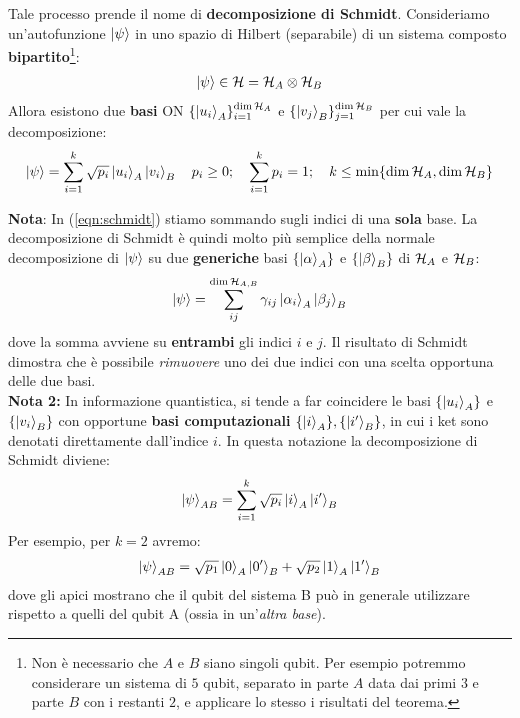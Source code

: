 \documentclass[../../InformazioneQuantistica.tex]{subfiles}
\begin{document}
Tale processo prende il nome di \textbf{decomposizione di Schmidt}. Consideriamo un'autofunzione $\Ket{\psi}$ in uno spazio di Hilbert (separabile) di un sistema composto \textbf{bipartito}\footnote{Non è necessario che $A$ e $B$ siano singoli qubit. Per esempio potremmo considerare un sistema di $5$ qubit, separato in parte $A$ data dai primi $3$ e parte $B$ con i restanti $2$, e applicare lo stesso i risultati del teorema.}:
\begin{align*}
\Ket{\psi}\in \mathcal{H} = \mathcal{H}_A \otimes \mathcal{H}_B
\end{align*}
Allora esistono due \textbf{basi} ON $\{\Ket{u_i}_A\}_{i=1}^{\operatorname{dim}\mathcal{H}_A}$ e $\{\Ket{v_j}_B\}_{j=1}^{\operatorname{dim}\mathcal{H}_B}$ per cui vale la decomposizione:
\begin{align}
\Ket{\psi}=\sum_{i=1}^k \sqrt{p_i} \Ket{u_i}_A \Ket{v_i}_B \quad p_i \geq 0;\quad \sum_{i=1}^k p_i = 1; \quad k\leq\min\{\operatorname{dim}\mathcal{H}_A
, \operatorname{dim}\mathcal{H}_B\}\label{eqn:schmidt}
\end{align}

\textbf{Nota}: In (\ref{eqn:schmidt}) stiamo sommando sugli indici di una \textbf{sola} base. La decomposizione di Schmidt è quindi molto più semplice della normale decomposizione di $\Ket{\psi}$ su due \textbf{generiche} basi $\{\Ket{\alpha}_A\}$ e $\{\Ket{\beta}_B\}$ di $\mathcal{H}_A$ e $\mathcal{H}_B$:
\begin{align}
\Ket{\psi} = \sum_{ij}^{\operatorname{dim}\mathcal{H}_{A,B}} \gamma_{ij}\Ket{\alpha_i}_A\Ket{\beta_j}_B\label{eqn:decomp-composto}
\end{align}
dove la somma avviene su \textbf{entrambi} gli indici $i$ e $j$. Il risultato di Schmidt dimostra che è possibile \textit{rimuovere} uno dei due indici con una scelta opportuna delle due basi.\\

\textbf{Nota 2:} In informazione quantistica, si tende a far coincidere le basi $\{\Ket{u_i}_A\}$ e $\{\Ket{v_i}_B\}$ con opportune \textbf{basi computazionali} $\{\Ket{i}_A\}, \{\Ket{i'}_B\}$, in cui i ket sono denotati  direttamente dall'indice $i$. In questa notazione la decomposizione di Schmidt diviene:
\begin{align*}
\Ket{\psi}_{AB} =\sum_{i=1}^k \sqrt{p_i} \Ket{i}_A \Ket{i'}_B
\end{align*}
Per esempio, per $k=2$ avremo:
\begin{align*}
\Ket{\psi}_{AB} = \sqrt{p_1}\Ket{0}_A \Ket{0'}_B + \sqrt{p_2}\Ket{1}_A \Ket{1'}_B
\end{align*}
dove gli apici mostrano che il qubit del sistema B può in generale utilizzare  rispetto a quelli del qubit A (ossia in un'\textit{altra base}).\\
\end{document}
